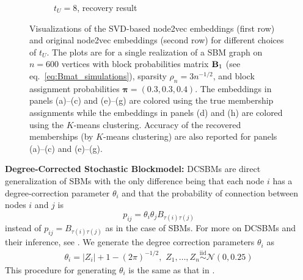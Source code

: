 \documentclass[10pt,journal,compsoc]{IEEEtran}
\newcommand{\ee}{\end{aligned} \end{equation}}
\newtheorem{remark}{Remark}
\newcommand{\T}{\top}
\def\T{{ \mathrm{\scriptscriptstyle T} }} %
\newcommand{\bee}{\begin{equation}\begin{aligned}}
\newcommand{\M}[1]{{{\mathbf{\MakeUppercase{#1}}}}}
\numberwithin{equation}{section}
\begin{document}
\begin{figure}[htbp]
\begin{subfigure}{.49\columnwidth}
\caption{$t_U = 8$, recovery result}
\end{subfigure}
\caption{Visualizations of the SVD-based node2vec embeddings (first row) and original node2vec embeddings (second row) for different choices of $t_U$. The plots are for a single realization of a SBM graph on $n = 600$ vertices with block probabilities matrix $\M B_1$ (see eq.~\eqref{eq:Bmat_simulations}), sparsity $\rho_n = 3n^{-1/2}$, and block assignment probabilities $\bm{\pi} = (0.3, 0.3, 0.4)$. The embeddings in panels (a)--(c) and (e)--(g) are colored using the true membership assignments while the embeddings in panels (d) and (h) are colored using the $K$-means clustering.
Accuracy of the recovered memberships (by $K$-means clustering) are also reported for panels 
(a)--(c) and (e)--(g).}
\label{f:embd:sbm}
\end{figure}

%

\noindent\textbf{Degree-Corrected Stochastic Blockmodel:} DCSBMs are direct
generalization of SBMs with the only difference being that each
node $i$ has a degree-correction parameter $\theta_i$ and that the
probability of connection between nodes $i$ and $j$ is
\begin{equation*}
p_{ij} = \theta_i \theta_j B_{\tau(i)\tau(j)}
\end{equation*}
instead of $p_{ij} = B_{\tau(i)\tau(j)}$ as in the case of
SBMs.  For more on DCSBMs and their inference, see
\cite{karrer2011stochastic,zhao2012consistency,gao2018community}. We generate the degree correction parameters $\theta_i$
as \bee\label{dg:cor}\theta_i = |Z_i| + 1 - (2\pi)^{-1/2}, \,\, Z_1,  \dots, Z_n \overset{\mathrm{iid}}{\sim}
\mathcal{N}(0,0.25)\ee
This procedure for generating $\theta_i$ is the same as that in \cite{gao2018community}. 
\end{document}
